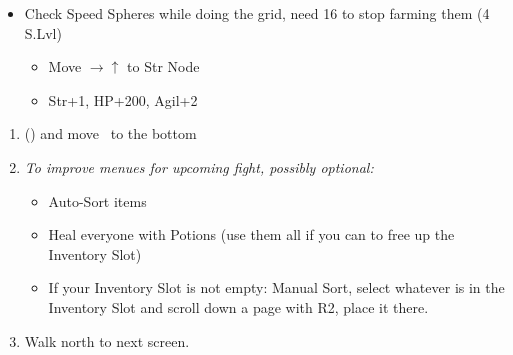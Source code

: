 \begin{spheregrid}
    \begin{itemize}
        \item Check Speed Spheres while doing the grid, need 16 to stop farming them
        \tidusf (4 S.Lvl)
        \begin{itemize}
            \item Move $\rightarrow\uparrow$ to Str Node
            \item Str+1, HP+200, Agil+2
        \end{itemize}
    \end{itemize}
\end{spheregrid}
\begin{enumerate}[resume]
    \item \formation{\tidus}{\wakka}{\auron} (\swap{\yuna}{\auron}) and move \yuna\ to the bottom
    \item \textit{To improve menues for upcoming fight, possibly optional:}
    \begin{itemize}
        \item Auto-Sort items
        \item Heal everyone with Potions (use them all if you can to free up the  Inventory Slot)
        \item If your  Inventory Slot is not empty: Manual Sort, select whatever is in the  Inventory Slot and scroll down a page with R2, place it there.
    \end{itemize}
    \item Walk north to next screen.
\end{enumerate}
